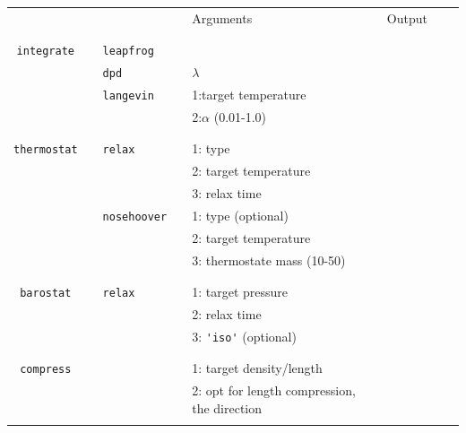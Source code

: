 \documentclass[11pt]{article}
\begin{document}
\clearpage
\begin{center}
  
  \begin{tabular}{cclclclll}
    {\color{red}{\textbf{Action}}} && {\color{blue}{Specifier}} && Arguments && Output \\
                                   && && && \\
    \hline
                                   && && && \\
    \verb!integrate! && \verb!leapfrog! && && \\
    $\mbox{}$ && \verb!dpd!      && $\lambda$ && \\
    $\mbox{}$ && \verb!langevin! && 1:target temperature && \\ 
    $\mbox{}$ &&                 && 2:$\alpha$ (0.01-1.0)&& \\
                                   && && && \\
    \hline
                                   && && && \\
    \verb!thermostat! && \verb!relax! && 1: type && \\
    $\mbox{}$   &&       && 2: target temperature && \\
    $\mbox{}$  &&        && 3: relax time && \\
    $\mbox{}$  && \verb!nosehoover! && 1: type (optional) && \\
    $\mbox{}$  &&            && 2: target temperature && \\
    $\mbox{}$  &&            && 3: thermostate mass (10-50)&& \\
                                   && && && \\
    \hline
                                   && && && \\
    \verb!barostat! && \verb!relax! && 1: target pressure && \\
    $\mbox{}$   &&       && 2: relax time && \\
    $\mbox{}$  &&        && 3: \verb!'iso'! (optional) && \\
                                   && && && \\
    \hline
                                   && && && \\
    \verb!compress! && && 1: target density/length && \\
    $\mbox{}$ &&       && 2: opt for length compression, the direction \\
                                   && && && \\

\end{tabular}
\end{center}
\end{document}
